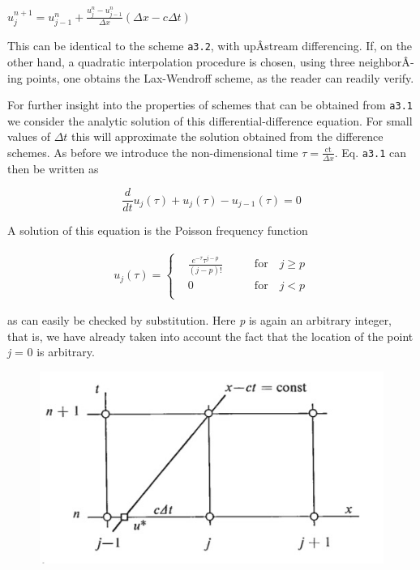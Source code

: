 \(u_{j}^{n + 1} = u_{j - 1}^{n} + \frac{u_{j}^{n} - u_{j - 1}^{n}}{\Delta x}\left( \Delta x - c\Delta t \right)\)

This can be identical to the scheme \texttt{a3.2}, with upÂ­stream
differencing. If, on the other hand, a quadratic interpolation procedure
is chosen, using three neighborÂ­ing points, one obtains the Lax-Wendroff
scheme, as the reader can readily verify.

For further insight into the properties of schemes that can be obtained
from \texttt{a3.1} we consider the analytic solution of this
differential-difference equation. For small values of \(\Delta t\) this
will approximate the solution obtained from the difference schemes. As
before we introduce the non-dimensional time
\(\tau = \frac{\text{ct}}{\Delta x}\). Eq. \texttt{a3.1} can then be
written as

 {\[\frac{d}{d t}u_{j}\left( \tau \right) + u_{j}\left( \tau \right) - u_{j - 1}\left( \tau \right) = 0\]}

A solution of this equation is the Poisson frequency function

 {\[\begin{aligned}
     u_j(\tau) = \left\{ \begin{array}{cc}
                          &\frac{e^{- \tau}\tau^{j - p}}{(j-p)!} \qquad &\textrm{for} \quad j \geq p \\
                          & 0  \qquad &\textrm{for} \quad j < p\\
     \end{array} \right.
\end{aligned}\]}

as can easily be checked by substitution. Here \emph{p} is again an
arbitrary integer, that is, we have already taken into account the fact
that the location of the point \emph{j} = 0 is arbitrary.

\begin{figure}
 \centering
 \includegraphics[keepaspectratio]{figs/NM/pic32.jpg}
 \caption{} \label{fig:}
\end{figure}

